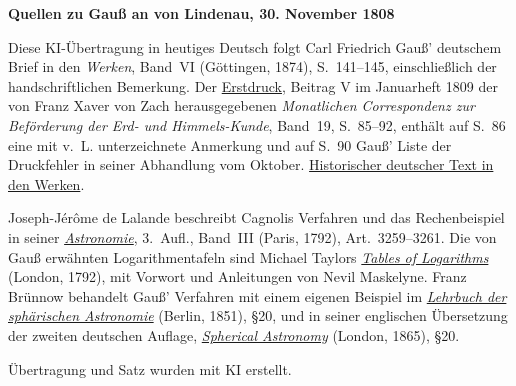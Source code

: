 \clearpage\thispagestyle{empty}
\begin{center}\textbf{Quellen zu Gauß an von Lindenau, 30. November 1808}\end{center}
\noindent Diese KI-Übertragung in heutiges Deutsch folgt Carl Friedrich Gauß’ deutschem Brief in den \textit{Werken}, Band~VI (Göttingen, 1874), S.~141--145, einschließlich der handschriftlichen Bemerkung. Der \href{https://archive.org/details/bub_gb_caMAAAAAMAAJ/page/n91/mode/1up}{Erstdruck}, Beitrag V im Januarheft 1809 der von Franz Xaver von Zach herausgegebenen \textit{Monatlichen Correspondenz zur Beförderung der Erd- und Himmels-Kunde}, Band~19, S.~85--92, enthält auf S.~86 eine mit v.~L. unterzeichnete Anmerkung und auf S.~90 Gauß’ Liste der Druckfehler in seiner Abhandlung vom Oktober. \href{https://gdz.sub.uni-goettingen.de/id/PPN236007467}{Historischer deutscher Text in den Werken}.
\par\smallskip\noindent Joseph-Jérôme de Lalande beschreibt Cagnolis Verfahren und das Rechenbeispiel in seiner \href{https://doi.org/10.3931/e-rara-9241}{\textit{Astronomie}}, 3.~Aufl., Band~III (Paris, 1792), Art.~3259--3261. Die von Gauß erwähnten Logarithmentafeln sind Michael Taylors \href{https://doi.org/10.3931/e-rara-9132}{\textit{Tables of Logarithms}} (London, 1792), mit Vorwort und Anleitungen von Nevil Maskelyne. Franz Brünnow behandelt Gauß’ Verfahren mit einem eigenen Beispiel im \href{https://archive.org/details/bub_gb_sAA5AAAAMAAJ/page/n306/mode/1up}{\textit{Lehrbuch der sphärischen Astronomie}} (Berlin, 1851), §20, und in seiner englischen Übersetzung der zweiten deutschen Auflage, \href{https://archive.org/details/sphericalastro00brhurich/page/n328/mode/1up}{\textit{Spherical Astronomy}} (London, 1865), §20.
\par\smallskip\noindent Übertragung und Satz wurden mit KI erstellt.
\clearpage
